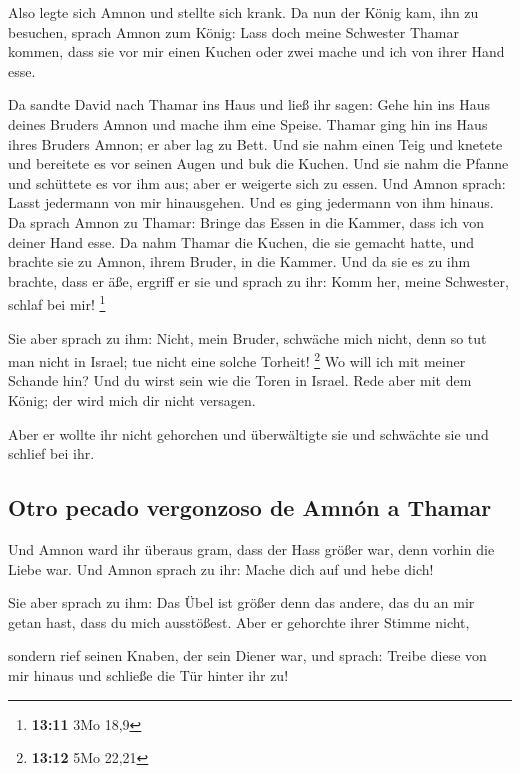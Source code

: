  Also legte sich Amnon und stellte sich krank. Da nun der
König kam, ihn zu besuchen, sprach Amnon zum König: Lass doch meine
Schwester Thamar kommen, dass sie vor mir einen Kuchen oder zwei mache
und ich von ihrer Hand esse.

 Da sandte David nach Thamar ins Haus und ließ ihr sagen:
Gehe hin ins Haus deines Bruders Amnon und mache ihm eine Speise.
 Thamar ging hin ins Haus ihres Bruders Amnon; er aber lag
zu Bett. Und sie nahm einen Teig und knetete und bereitete es vor seinen
Augen und buk die Kuchen.  Und sie nahm die Pfanne und
schüttete es vor ihm aus; aber er weigerte sich zu essen. Und Amnon
sprach: Lasst jedermann von mir hinausgehen. Und es ging jedermann von
ihm hinaus.  Da sprach Amnon zu Thamar: Bringe das Essen
in die Kammer, dass ich von deiner Hand esse. Da nahm Thamar die Kuchen,
die sie gemacht hatte, und brachte sie zu Amnon, ihrem Bruder, in die
Kammer.  Und da sie es zu ihm brachte, dass er äße,
ergriff er sie und sprach zu ihr: Komm her, meine Schwester, schlaf bei
mir! \footnote{\textbf{13:11} 3Mo 18,9}

 Sie aber sprach zu ihm: Nicht, mein Bruder, schwäche
mich nicht, denn so tut man nicht in Israel; tue nicht eine solche
Torheit! \footnote{\textbf{13:12} 5Mo 22,21}  Wo will ich
mit meiner Schande hin? Und du wirst sein wie die Toren in Israel. Rede
aber mit dem König; der wird mich dir nicht versagen.

 Aber er wollte ihr nicht gehorchen und überwältigte sie
und schwächte sie und schlief bei ihr.

\hypertarget{otro-pecado-vergonzoso-de-amnuxf3n-a-thamar}{%
\subsection{Otro pecado vergonzoso de Amnón a
Thamar}\label{otro-pecado-vergonzoso-de-amnuxf3n-a-thamar}}

 Und Amnon ward ihr überaus gram, dass der Hass größer
war, denn vorhin die Liebe war. Und Amnon sprach zu ihr: Mache dich auf
und hebe dich!

 Sie aber sprach zu ihm: Das Übel ist größer denn das
andere, das du an mir getan hast, dass du mich ausstößest. Aber er
gehorchte ihrer Stimme nicht,

 sondern rief seinen Knaben, der sein Diener war, und
sprach: Treibe diese von mir hinaus und schließe die Tür hinter ihr zu!


